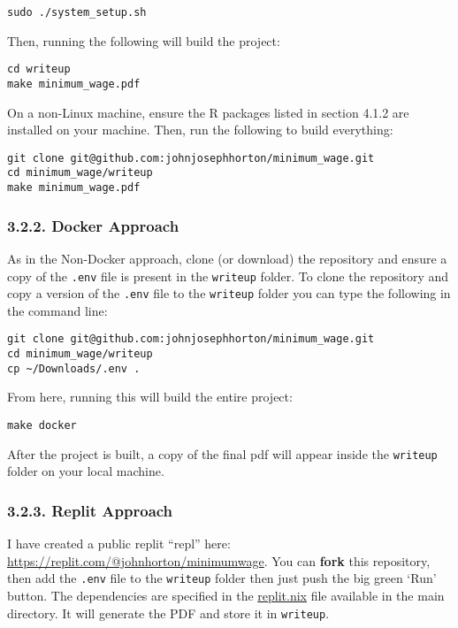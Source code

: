 \documentclass[10pt]{article}
\begin{document}
\begin{verbatim}
sudo ./system_setup.sh
\end{verbatim}

Then, running the following will build the project:

\begin{verbatim}
cd writeup 
make minimum_wage.pdf
\end{verbatim}

On a non-Linux machine, ensure the R packages listed in section 4.1.2 are installed on your machine. 
Then, run the following to build everything:

\begin{verbatim}
git clone git@github.com:johnjosephhorton/minimum_wage.git
cd minimum_wage/writeup
make minimum_wage.pdf
\end{verbatim}

\subsubsection*{3.2.2. Docker Approach}

As in the Non-Docker approach, clone (or download) the repository and ensure a copy of the \texttt{.env} file is present in the \texttt{writeup} folder.
To clone the repository and copy a version of the \texttt{.env} file to the \texttt{writeup} folder you can type the following in the command line:

\begin{verbatim}
git clone git@github.com:johnjosephhorton/minimum_wage.git
cd minimum_wage/writeup
cp ~/Downloads/.env .
\end{verbatim}

From here, running this will build the entire project:

\begin{verbatim}
make docker
\end{verbatim}

After the project is built, a copy of the final pdf will appear inside the \texttt{writeup} folder on your local machine.

\subsubsection*{3.2.3. Replit Approach}

I have created a public replit ``repl'' here: \href{https://replit.com/@johnhorton/minimumwage}{https://replit.com/@johnhorton/minimumwage}.
You can \textbf{fork} this repository, then add the \texttt{.env} file to the \texttt{writeup} folder then just push the big green `Run' button.
The dependencies are specified in the \href{https://www.github.com/johnjosephhorton/minimum_wage/blob/main/replit.nix}{replit.nix} file available in the main directory.
It will generate the PDF and store it in \texttt{writeup}.
\end{document}
